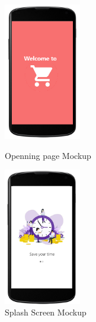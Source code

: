 \begin{figure}[H]
  \centering
  \includegraphics[width=0.3\textwidth,keepaspectratio]{images/2.png}
  \caption{Openning page Mockup}
  \centering
  \includegraphics[width=0.3\textwidth,keepaspectratio]{images/3.jpg}
  \caption{Splash Screen Mockup}
\end{figure}
